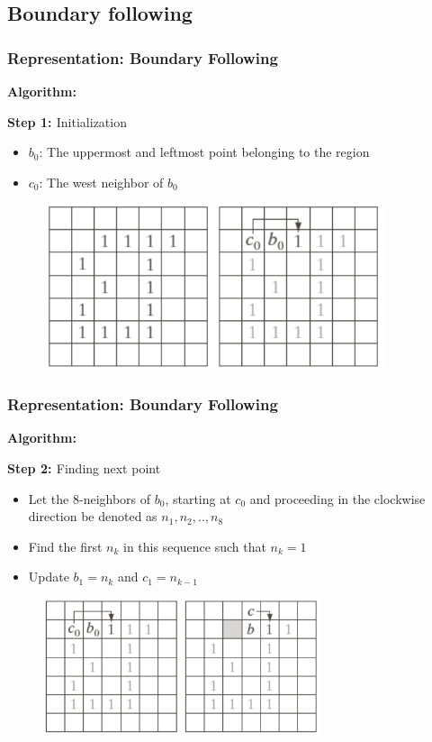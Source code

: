 \documentclass[english,11pt,table,handout]{beamer}
\begin{document}
\subsection{Boundary following}
\frame
{
	\frametitle{Representation: Boundary Following}
	\textbf{Algorithm:}
	\begin{block}{\textbf{\alert{Step 1: }} Initialization}
	\end{block}
	\begin{itemize}
		\item $b_0$: The uppermost and leftmost point belonging to the region
		\item $c_0$: The west neighbor of $b_0$
	\end{itemize}
	\begin{figure}[!h]
		\includegraphics[width=10cm]{bfollow_1.png}
	\end{figure}
	
	
}
\frame
{
	\frametitle{Representation: Boundary Following}
	\textbf{Algorithm:}
	\begin{block}{\textbf{\alert{Step 2: }} Finding next point}
	\end{block}
	\begin{itemize}
		\item Let the 8-neighbors of $b_0$, starting at $c_0$ and proceeding in the clockwise direction be denoted as $n_1, n_2, .., n_8$
		\item Find the first $n_k$ in this sequence such that $n_k = 1$
		\item Update $b_1=n_k$ and $c_1=n_{k-1}$
	\end{itemize}
	\begin{figure}[!h]
		\includegraphics[height=4cm]{bfollow_2.png}
	\end{figure}	
}
\end{document}
